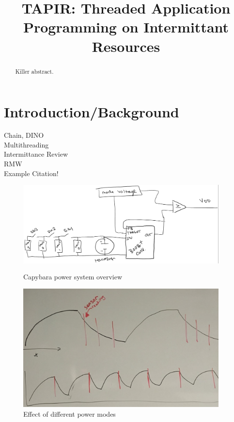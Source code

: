 \documentclass[11pt]{sensys-proc}
\title{TAPIR: Threaded Application Programming on Intermittant Resources}
\begin{document}
\maketitle

\begin{abstract}
Killer abstract.
\end{abstract}

\section{Introduction/Background}
  \label{sec:intro}
  Chain, DINO\\
  Multithreading\\
  Intermittance Review\\
  RMW\\
  Example Citation\cite{RC,Grace}!


\begin{figure}
\centering
\begin{minipage}[b]{0.49\textwidth}
  \includegraphics[width=0.95\textwidth,center]{capybara-all.png}
\caption{Capybara power system overview}\label{label-a}
\end{minipage}\hfill
\begin{minipage}[b]{0.49\textwidth}
  \includegraphics[width=0.95\textwidth,center]{power_modes.pdf}
\caption{Effect of different power modes}\label{label-b}
\end{minipage}
\end{figure}
\end{document}
